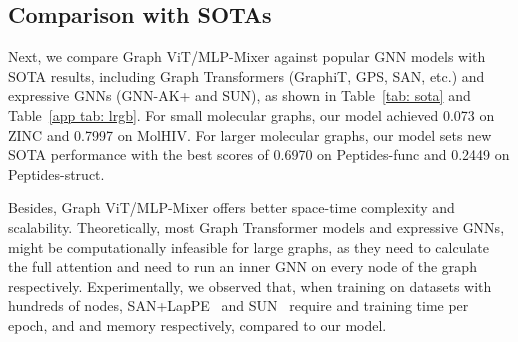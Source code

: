 \documentclass{article}
\begin{document}
\subsection{Comparison with SOTAs}

Next, we compare Graph ViT/MLP-Mixer against popular GNN models with SOTA results, including Graph Transformers (GraphiT, GPS, SAN, etc.) and expressive GNNs (GNN-AK+ and SUN),
as shown in Table~\ref{tab: sota} and Table~\ref{app tab: lrgb}. For small molecular graphs, our model achieved 0.073 on ZINC and 0.7997 on MolHIV. For larger molecular graphs, our model sets new SOTA performance with the best scores of 0.6970 on Peptides-func and 0.2449 on Peptides-struct. 


Besides, Graph ViT/MLP-Mixer offers better space-time complexity and scalability. 
Theoretically, most Graph Transformer models and expressive GNNs, might be computationally infeasible for large graphs, as they need to calculate the full attention and need to run an inner GNN on every node of the graph respectively. Experimentally, we observed that, when training on datasets with hundreds of nodes, SAN+LapPE~\citep{chen2022structure_SAT} and SUN~\citep{sun} require  and  training time per epoch, and  and  memory respectively, compared to our model. 
\end{document}
